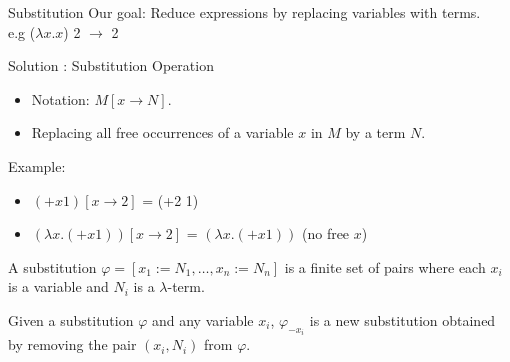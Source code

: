 \documentclass{beamer}
\begin{document}
\begin{frame}{Substitution}
  Our goal: Reduce expressions by replacing variables with terms.\\
  e.g ($\lambda x.x$) 2 $\to$ 2\\
  \vspace{1em}
  \begin{block}{}
  Solution : Substitution Operation
  \end{block}
  \begin{itemize}
    \item Notation: $M[x \to N]$.
    \item Replacing all free occurrences of a variable $x$ in $M$ by a term $N$.
  \end{itemize}
  Example:
  \begin{itemize}
    \item  $(+x1)[x\to 2]$ = (+2 1)
    \item $(\lambda x.(+x1))[x\to 2]$ = $(\lambda x.(+x1))$ (no free $x$)\\
  \end{itemize}
\end{frame}

\begin{definition}
  A substitution $\varphi = [x_1 := N_1, \ldots, x_n := N_n]$ is a finite set of pairs where each \(x_i\) is a variable and \(N_i\) is a $\lambda$-term.\\
\end{definition}
\begin{definition}
  Given a substitution \(\varphi\) and any variable \(x_i\), \(\varphi_{-x_i}\) is a new substitution obtained by removing the pair \((x_i, N_i)\) from \(\varphi\).\\
\end{definition}


\end{document}
